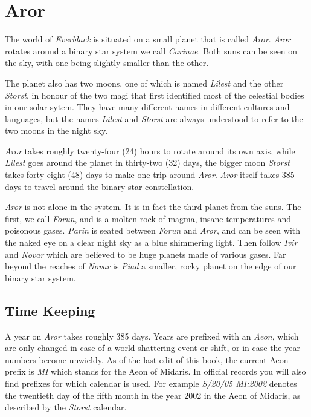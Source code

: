 \twocolumn
\section{Aror}
\label{sec:Aror}

The world of \emph{Everblack} is situated on a small planet that is
called \emph{Aror}. \emph{Aror} rotates around a binary star system we
call \emph{Carinae}. Both suns can be seen on the sky, with one being
slightly smaller than the other.

The planet also has two moons, one of which is named \emph{Lilest} and
the other \emph{Storst}, in honour of the two magi that first
identified most of the celestial bodies in our solar sytem. They have
many different names in different cultures and languages, but the
names \emph{Lilest} and \emph{Storst} are always understood to refer
to the two moons in the night sky.

\emph{Aror} takes roughly twenty-four (24) hours to rotate around its
own axis, while \emph{Lilest} goes around the planet in thirty-two
(32) days, the bigger moon \emph{Storst} takes forty-eight (48) days
to make one trip around \emph{Aror}. \emph{Aror} itself takes 385 days
to travel around the binary star constellation.

\emph{Aror} is not alone in the system. It is in fact the third planet
from the suns. The first, we call \emph{Forun}, and is a molten rock
of magma, insane temperatures and poisonous gases. \emph{Parin} is
seated between \emph{Forun} and \emph{Aror}, and can be seen with the
naked eye on a clear night sky as a blue shimmering light. Then follow
\emph{Ivir} and \emph{Novar} which are believed to be huge planets made
of various gases. Far beyond the reaches of \emph{Novar} is
\emph{Piad} a smaller, rocky planet on the edge of our binary star
system.

\subsection{Time Keeping}

A year on \emph{Aror} takes roughly 385 days. Years are prefixed with an
\emph{Aeon}, which are only changed in case of a world-shattering event
or shift, or in case the year numbers become unwieldy. As of the last
edit of this book, the current Aeon prefix is \emph{MI} which stands for
the Aeon of Midaris. In official records you will also find prefixes for
which calendar is used. For example \emph{S/20/05 MI:2002} denotes the
twentieth day of the fifth month in the year 2002 in the Aeon of
Midaris, as described by the \emph{Storst} calendar.

